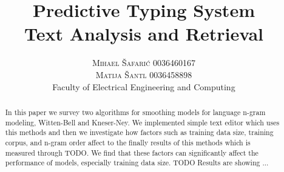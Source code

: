 \documentclass[twoside]{article}
\title{\vspace{-15mm}\fontsize{24pt}{10pt}\selectfont\textbf{Predictive Typing System \\ \fontsize{18pt}{10pt}\selectfont Text Analysis and Retrieval}} %
\author{
\large
\textsc{Mihael Šafarić 0036460167}\\\textsc{Matija Šantl 0036458898}\\
\normalsize Faculty of Electrical Engineering and Computing \\
\vspace{-5mm}
}
\date{}
\begin{document}
\maketitle %

\thispagestyle{fancy} %


\begin{abstract}
In this paper we survey two algorithms for smoothing models for language n-gram modeling, Witten-Bell and Kneser-Ney. We implemented simple text editor which uses this methods and then we investigate how factors such as training data size, training corpus, and n-gram order affect to the finally results of this methods which is measured through TODO. We find that these factors can significantly affect the performance of models, especially training data size. TODO Results are showing ...
\end{abstract}

\end{document}
